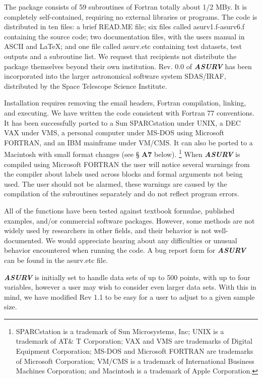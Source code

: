 The package consists of 59 subroutines of Fortran totally about 1/2 MBy. It
is completely self-contained, requiring no external libraries or programs.  The
code is distributed in ten files: a brief READ.ME file; six files 
called asurv1.f-asurv6.f containing the source code; two documentation files,
with the users manual in ASCII and LaTeX; and one file called asurv.etc
containing test datasets, test outputs and a subroutine list. We request 
that  recipients not 
distribute the package themselves beyond their own institution.  Rev. 0.0
of {\sl\bf ASURV} has been incorporated into the larger astronomical software 
system SDAS/IRAF, distributed by the Space Telescope Science Institute. 
 
     Installation requires removing the email headers, Fortran 
compilation, linking, and executing.  We have written the code
consistent with Fortran 77 conventions.  It has been successfully ported
to a Sun SPARCstation under UNIX, a DEC VAX under VMS, a personal computer
under MS-DOS using Microsoft FORTRAN, and an IBM mainframe under VM/CMS.
It can also be ported to a Macintosh with small format changes (see \S
{\bf A7} below).  
\footnote{SPARCstation is a trademark of Sun Microsystems, Inc; UNIX is a 
trademark of AT\& T Corporation; VAX and VMS are trademarks of Digital 
Equipment Corporation; MS-DOS and Microsoft FORTRAN are trademarks of
Microsoft Corporation; VM/CMS is a trademark of International
Business Machines Corporation; and Macintosh is a trademark of Apple
Corporation.}
When {\sl\bf ASURV} is compiled using Microsoft FORTRAN the
user will notice several warnings from the compiler about labels used across
blocks and formal arguments not being used.  The user should not be alarmed,
these warnings are caused by the compilation of the subroutines separately
and do not reflect program errors.

     All of the functions have been tested against textbook formulae, 
published examples, and/or commercial software  packages.  However, some 
methods are not widely used by researchers in other fields, and their behavior
is not well-documented.  We would appreciate hearing about any difficulties or
unusual behavior encountered when running the code. A bug report form for
{\sl\bf ASURV} can be found in the asurv.etc file. 

\bigskip
\bigskip


       {\sl\bf ASURV} is initially set to handle data sets of up to 
500 points, with up to  four variables, however a user may wish to 
consider even larger data sets.  With this in mind, we have modified 
Rev 1.1 to be easy for a user to adjust to a given sample size.

